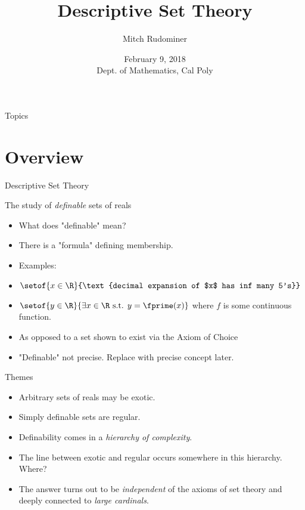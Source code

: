 \documentclass{beamer}
\title{Descriptive Set Theory}
\author{Mitch Rudominer}
\institute{Google}
\date
{February 9, 2018 \\ Dept. of Mathematics, Cal Poly }
\begin{document}
\begin{frame}
  \titlepage
\end{frame}

\begin{frame}{Topics}
  \tableofcontents
\end{frame}




\section{Overview}


\begin{frame}{Descriptive Set Theory}

The study of \emph{definable} sets of reals

\pause

  \begin{itemize}
  \item What does "definable" mean?
  \item There is a "formula" defining membership.
  \item Examples:
  \item $\setof{x\in\R}{\text{decimal expansion of $x$ has inf many 5's}}$
  \item $\setof{y\in\R}{\exists x\in\R \text{ s.t. } y=\fprime(x)}$ where $f$ is some continuous function.
  \item As opposed to a set shown to exist via the Axiom of Choice
  \item "Definable" not precise. Replace with precise concept later.
  \end{itemize}


\end{frame}

\begin{frame}{Themes}

  \begin{itemize}
  \item Arbitrary sets of reals may be exotic.
  \item Simply definable sets are regular.
  \item Definability comes in a \emph{hierarchy of complexity}.
  \item The line between exotic and regular occurs somewhere in this
  hierarchy. Where?
  \item The answer turns out to be \emph{independent} of the axioms of set theory
  and deeply connected to \emph{large cardinals}.
  \end{itemize}
\end{frame}
\end{document}
